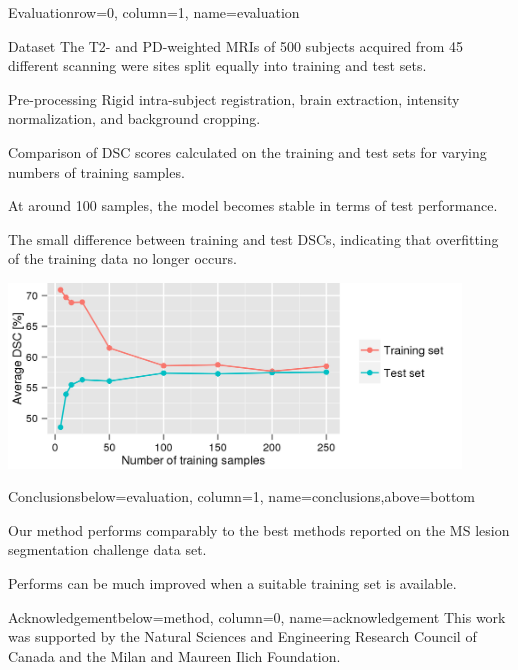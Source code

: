 \documentclass[%
portrait,paperwidth=841mm,paperheight=1180mm,%
margin=2cm,
fontscale=0.32
]{baposter}
\begin{document}
\begin{poster}
\begin{headerblock}{Evaluation}{row=0, column=1, name=evaluation}
\begin{compactdesc}
\item[Dataset] The T2- and PD-weighted MRIs of 500 subjects acquired from 45
different scanning were sites split equally into training and test sets.
\item[Pre-processing] Rigid intra-subject registration, brain extraction,
intensity normalization, and background cropping.
\end{compactdesc}
\begin{compactitem}
\item Comparison of DSC scores calculated on the training and test sets for
varying numbers of training samples.
\item At around 100 samples, the model becomes
stable in terms of test performance.
\item The small difference between training and test DSCs, indicating that
overfitting of the training data no longer occurs.
\end{compactitem}
\begin{center}
\includegraphics[width=0.9\textwidth]{figures/train_count}
\end{center}
\end{headerblock}

\begin{headerblock}{Conclusions}{below=evaluation, column=1,
name=conclusions,above=bottom}
\begin{compactitem} 
  \item Our method performs comparably to the best methods reported on the MS
lesion segmentation challenge data set.
  \item Performs can be much improved when a suitable training set is available.
\end{compactitem} 
\end{headerblock}

\begin{headerblock}{Acknowledgement}{below=method, column=0,
name=acknowledgement}
This work was supported by the Natural Sciences and
Engineering Research Council of Canada and the Milan and Maureen Ilich Foundation.
\end{headerblock}


\end{poster}
\end{document}
